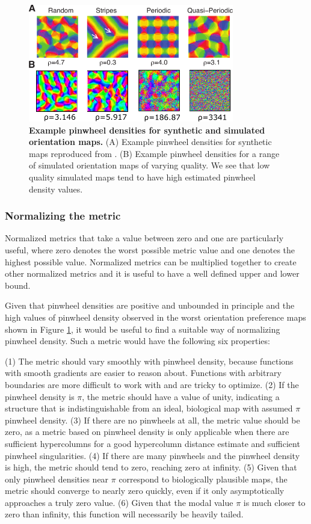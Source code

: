 \documentclass[phd,ianc,twoside]{infthesis}
\begin{document}
\begin{figure}
\centerline{
\includegraphics[width=0.8\textwidth]{./figures/synthetic_pi_density.pdf}
}
\caption[]{{\bf Example pinwheel densities for synthetic and simulated
    orientation maps.} (A) Example pinwheel densities for synthetic maps
  reproduced from \citet{kaschube_science10}.  (B) Example pinwheel
  densities for a range of simulated orientation maps of varying
  quality. We see that low quality simulated maps tend to have high
  estimated pinwheel density values.}
\label{fig:synthetic_pi_density}
\end{figure}

\subsubsection*{Normalizing the metric}

Normalized metrics that take a value between zero and one are
particularly useful, where zero denotes the worst possible metric value
and one denotes the highest possible value. Normalized metrics can be
multiplied together to create other normalized metrics and it is useful
to have a well defined upper and lower bound.

Given that pinwheel densities are positive and unbounded in principle
and the high values of pinwheel density observed in the worst
orientation preference maps shown in Figure
\ref{fig:synthetic_pi_density}, it would be useful to find a suitable
way of normalizing pinwheel density. Such a metric would have the
following six properties:

(1) The metric should vary smoothly with pinwheel density, because
functions with smooth gradients are easier to reason about. Functions
with arbitrary boundaries are more difficult to work with and are 
tricky to optimize. (2) If the pinwheel density is $\pi$, the metric should
have a value of unity, indicating a structure that is indistinguishable
from an ideal, biological map with assumed $\pi$ pinwheel density.
(3) If there are no pinwheels at all, the metric value should be zero, as a
metric based on pinwheel density is only applicable when there are
sufficient hypercolumns for a good hypercolumn distance estimate and
sufficient pinwheel singularities. (4) If there are many pinwheels and the
pinwheel density is high, the metric should tend to zero, reaching zero
at infinity. (5) Given that only pinwheel densities near $\pi$ correspond to
biologically plausible maps, the metric should converge to nearly zero
quickly, even if it only asymptotically approaches a truly zero value.
(6) Given that the modal value
$\pi$ is much closer to zero than infinity, this function will
necessarily be heavily tailed.
\end{document}
